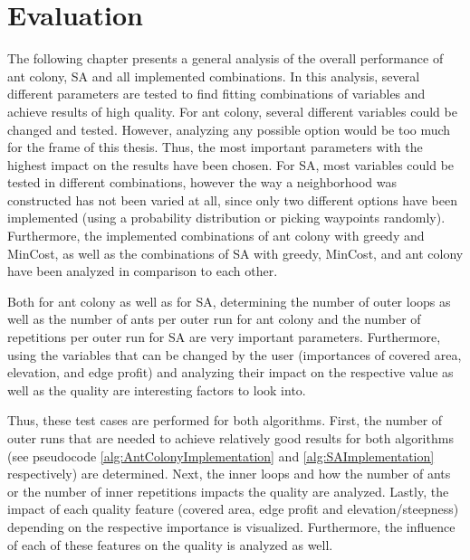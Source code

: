 \chapter{Evaluation}
\label{chapter:evaluation}

The following chapter presents a general analysis of the overall performance of ant colony, SA and all implemented combinations.
In this analysis, several different parameters are tested to find fitting combinations of variables and achieve results of high quality.
For ant colony, several different variables could be changed and tested. 
However, analyzing any possible option would be too much for the frame of this thesis.
Thus, the most important parameters with the highest impact on the results have been chosen.
For SA, most variables could be tested in different combinations, however the way a neighborhood was constructed has not been varied at all, since only two different options have been implemented (using a probability distribution or picking waypoints randomly).
Furthermore, the implemented combinations of ant colony with greedy and MinCost, as well as the combinations of SA with greedy, MinCost, and ant colony have been analyzed in comparison to each other. 


Both for ant colony as well as for SA, determining the number of outer loops as well as the number of ants per outer run for ant colony and the number of repetitions per outer run for SA are very important parameters.
Furthermore, using the variables that can be changed by the user (importances of covered area, elevation, and edge profit) and analyzing their impact on the respective value as well as the quality are interesting factors to look into.

Thus, these test cases are performed for both algorithms.
First, the number of outer runs that are needed to achieve relatively good results for both algorithms (see pseudocode \ref{alg:AntColonyImplementation} and \ref{alg:SAImplementation} respectively) are determined.
Next, the inner loops and how the number of ants or the number of inner repetitions impacts the quality are analyzed.
Lastly, the impact of each quality feature (covered area, edge profit and elevation/steepness) depending on the respective importance is visualized.
Furthermore, the influence of each of these features on the quality is analyzed as well.

